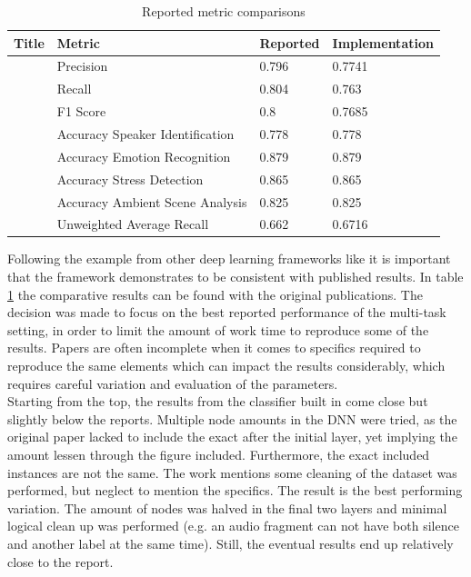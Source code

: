 \begin{table}[ht]
	\caption{Reported metric comparisons} %
	\centering %
	\begin{tabular}{p{}p{}p{}p{}} %
		\hline\hline %
		Title & Metric & Reported & Implementation  \\ [0.5ex] %
		\hline %
		\citet{park2020augmenting} & Precision & 0.796 & 0.7741 \\ \hline
		\citet{park2020augmenting} & Recall & 0.804 & 0.763  \\ \hline
		\citet{park2020augmenting} & F1 Score & 0.8 & 0.7685 \\ \hline
		\citet{georgiev2017low} & Accuracy Speaker Identification & 0.778 & 0.778 \\ \hline
		\citet{georgiev2017low} & Accuracy Emotion Recognition & 0.879 & 0.879 \\ \hline
		\citet{georgiev2017low} & Accuracy Stress Detection & 0.865 & 0.865 \\ \hline
		\citet{georgiev2017low} & Accuracy Ambient Scene Analysis & 0.825 & 0.825 \\ \hline
		\citet{xu2019multi} & Unweighted Average Recall & 0.662 & 0.6716 \\ \hline
	\end{tabular}
	\label{table:metric} %
\end{table}

Following the example from other deep learning frameworks like \cite{colacco2020drecpy} it is important that the framework demonstrates to be consistent with published results. In table \ref{table:metric} the comparative results can be found with the original publications. The decision was made to focus on the best reported performance of the multi-task setting, in order to limit the amount of work time to reproduce some of the results. Papers are often incomplete when it comes to specifics required to reproduce the same elements which can impact the results considerably, which requires careful variation and evaluation of the parameters.\\

Starting from the top, the results from the classifier built in \cite{park2020augmenting} come close but slightly below the reports. Multiple node amounts in the DNN were tried, as the original paper lacked to include the exact after the initial layer, yet implying the amount lessen through the figure included. Furthermore, the exact included instances are not the same. The work mentions some cleaning of the dataset was performed, but neglect to mention the specifics. The result is the best performing variation. The amount of nodes was halved in the final two layers and minimal logical clean up was performed (e.g. an audio fragment can not have both silence and another label at the same time). Still, the eventual results end up relatively close to the report.\\


